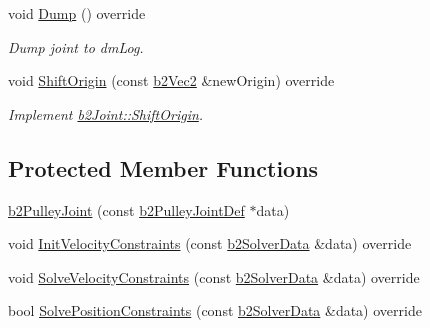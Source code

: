 \begin{DoxyCompactItemize}
void \mbox{\hyperlink{classb2_pulley_joint_a51b3fa745fc43f806cee1328099b4623}{Dump}} () override
\begin{DoxyCompactList}\small\item\em Dump joint to dm\+Log. \end{DoxyCompactList}\item 
void \mbox{\hyperlink{classb2_pulley_joint_a5a9e626c758380fe565837bedb3dc018}{Shift\+Origin}} (const \mbox{\hyperlink{structb2_vec2}{b2\+Vec2}} \&new\+Origin) override
\begin{DoxyCompactList}\small\item\em Implement \mbox{\hyperlink{classb2_joint_a7804f649e993dc0fd9ae47fde5601f90}{b2\+Joint\+::\+Shift\+Origin}}. \end{DoxyCompactList}\end{DoxyCompactItemize}
\subsection*{Protected Member Functions}
\begin{DoxyCompactItemize}
\item 
\mbox{\hyperlink{classb2_pulley_joint_aca1b8dc6fb05c134ccbc0423674c1867}{b2\+Pulley\+Joint}} (const \mbox{\hyperlink{structb2_pulley_joint_def}{b2\+Pulley\+Joint\+Def}} $\ast$data)
\item 
void \mbox{\hyperlink{classb2_pulley_joint_a1826611f1dfe6284c3ce3afdab875e94}{Init\+Velocity\+Constraints}} (const \mbox{\hyperlink{structb2_solver_data}{b2\+Solver\+Data}} \&data) override
\item 
void \mbox{\hyperlink{classb2_pulley_joint_a80de874e392a8238fd2e965f5080222b}{Solve\+Velocity\+Constraints}} (const \mbox{\hyperlink{structb2_solver_data}{b2\+Solver\+Data}} \&data) override
\item 
bool \mbox{\hyperlink{classb2_pulley_joint_ac3d5f78f3bdd248ca368add8f21b7e95}{Solve\+Position\+Constraints}} (const \mbox{\hyperlink{structb2_solver_data}{b2\+Solver\+Data}} \&data) override
\end{DoxyCompactItemize}
